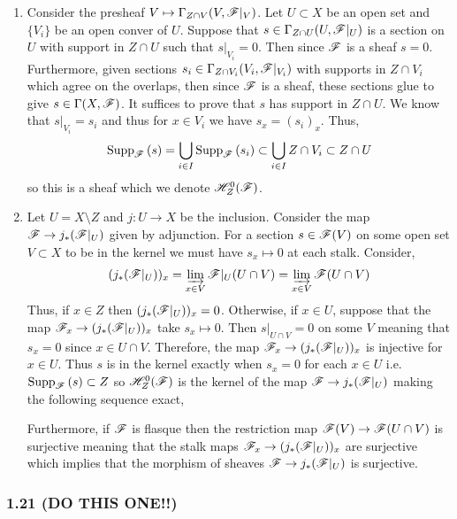 \documentclass[12pt]{article}
\begin{document}
\begin{enumerate}
\item Consider the presheaf $V \mapsto \Gamma_{Z \cap V}(V, \mathscr{F}|_V)$. Let $U \subset X$ be an open set and $\{ V_i \}$ be an open conver of $U$. Suppose that $s \in \Gamma_{Z \cap U}(U, \mathscr{F}|_U)$ is a section on $U$ with support in $Z \cap U$ such that $s|_{V_i} = 0$. Then since $\mathscr{F}$ is a sheaf $s = 0$. Furthermore, given sections $s_i \in \Gamma_{Z \cap V_i}(V_i, \mathscr{F}|_{V_i})$ with supports in $Z \cap V_i$ which agree on the overlaps, then since $\mathscr{F}$ is a sheaf, these sections glue to give $s \in \Gamma(X, \mathscr{F})$. It suffices to prove that $s$ has support in $Z \cap U$. We know that $s |_{V_i} = s_i$ and thus for $x \in V_i$ we have $s_x = (s_i)_x$. Thus, 
\[ \mathrm{Supp}_{\mathscr{F}}\left(s \right) = \bigcup_{i \in I} \mathrm{Supp}_{\mathscr{F}}\left(s_i \right) \subset \bigcup_{i \in I} Z \cap V_i \subset Z \cap U \]
so this is a sheaf which we denote $\mathscr{H}^0_Z(\mathscr{F})$. 
\item Let $U = X \setminus Z$ and $j : U \to X$ be the inclusion. Consider the map $\mathscr{F} \to j_* (\mathscr{F} |_U)$ given by adjunction. For a section $s \in \mathscr{F}(V)$ on some open set $V \subset X$ to be in the kernel we must have $s_x \mapsto 0$ at each stalk. Consider,
\begin{align*}
(j_* (\mathscr{F} |_U))_x = \varinjlim_{x \in V} \mathscr{F}|_U(U \cap V) = \varinjlim_{x \in V} \mathscr{F}(U \cap V) 
\end{align*}
Thus, if $x \in Z$ then $(j_* (\mathscr{F} |_U))_x = 0$. Otherwise, if $x \in U$, suppose that the map $\mathscr{F}_x \to (j_* (\mathscr{F} |_U))_x$ take $s_x \mapsto 0$. Then $s|_{U \cap V} = 0$ on some $V$ meaning that $s_x = 0$ since $x \in U \cap V$. Therefore, the map $\mathscr{F}_x \to (j_* (\mathscr{F} |_U))_x$ is injective for $x \in U$. Thus $s$ is in the kernel exactly when $s_x = 0$ for each $x \in U$ i.e. $\mathrm{Supp}_{\mathscr{F}}\left(s \right) \subset Z$ so $\mathscr{H}^0_Z(\mathscr{F})$ is the kernel of the map $\mathscr{F} \to j_* (\mathscr{F}|_U)$ making the following sequence exact,
\begin{center}
\end{center}
Furthermore, if $\mathscr{F}$ is flasque then the restriction map $\mathscr{F}(V) \to \mathscr{F}(U \cap V)$ is surjective meaning that the stalk maps $\mathscr{F}_x \to (j_* (\mathscr{F} |_U))_x$ are surjective which implies that the morphism of sheaves $\mathscr{F} \to j_* (\mathscr{F} |_U)$ is surjective.
\end{enumerate}

\subsubsection{1.21 (DO THIS ONE!!)}
\end{document}
